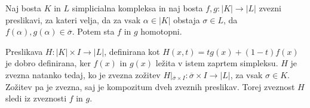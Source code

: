 \documentclass[mat1]{fmfdelo}
\DeclareMathOperator*{\supp}{supp}
\begin{document}
 
 
 
 
 


 \begin{trditev}
    Naj bosta $K$ in $L$ simplicialna kompleksa in naj bosta $f,g\colon |K|\rightarrow |L|$ zvezni preslikavi, za kateri velja, da za vsak $\alpha\in |K|$ obstaja $\sigma \in L$, da $f(\alpha),g(\alpha) \in \overline{\sigma}.$ Potem sta $f$ in $g$ homotopni.
    \label{tr:shom}
\end{trditev}

\begin{dokaz}
    Preslikava $H\colon |K|\times I\rightarrow |L|$, definirana kot $H(x,t)=tg(x) + (1-t)f(x)$ je dobro definirana, ker $f(x)$ in $g(x)$ ležita v istem zaprtem simpleksu. $H$ je zvezna natanko tedaj, ko je zvezna zožitev $H|_{\overline{\sigma}\times I}\colon \overline{\sigma}\times I \rightarrow |L|$, za vsak $\sigma \in K$. Zožitev pa je zvezna, saj je kompozitum dveh zveznih preslikav. Torej zveznost $H$ sledi iz zveznosti $f$ in $g$.

\end{dokaz}
\end{document}
